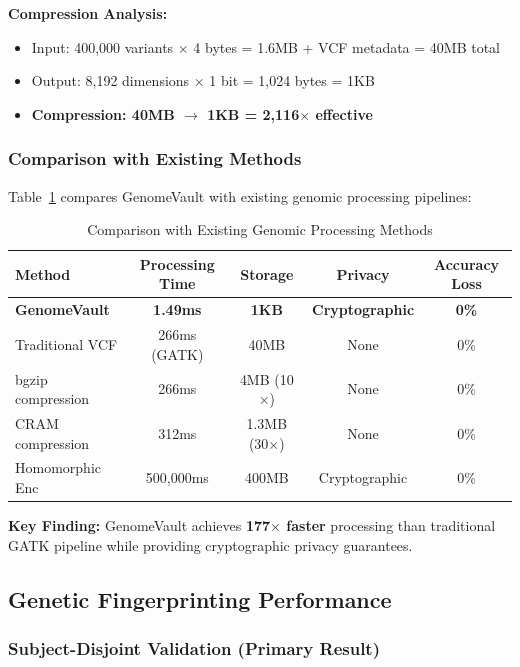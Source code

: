 \documentclass[11pt,a4paper]{article}
\begin{document}
\textbf{Compression Analysis:}
\begin{itemize}
    \item Input: 400,000 variants $\times$ 4 bytes = 1.6MB + VCF metadata = 40MB total
    \item Output: 8,192 dimensions $\times$ 1 bit = 1,024 bytes = 1KB
    \item \textbf{Compression: 40MB $\rightarrow$ 1KB = 2,116$\times$ effective}
\end{itemize}

\subsubsection{Comparison with Existing Methods}

Table~\ref{tab:comparison} compares GenomeVault with existing genomic processing pipelines:

\begin{table}[H]
\centering
\caption{Comparison with Existing Genomic Processing Methods}
\label{tab:comparison}
\begin{tabular}{lcccc}
\toprule
\textbf{Method} & \textbf{Processing Time} & \textbf{Storage} & \textbf{Privacy} & \textbf{Accuracy Loss} \\
\midrule
\textbf{GenomeVault} & \textbf{1.49ms} & \textbf{1KB} & \textbf{Cryptographic} & \textbf{0\%} \\
Traditional VCF & 266ms (GATK) & 40MB & None & 0\% \\
bgzip compression & 266ms & 4MB (10$\times$) & None & 0\% \\
CRAM compression & 312ms & 1.3MB (30$\times$) & None & 0\% \\
Homomorphic Enc & 500,000ms & 400MB & Cryptographic & 0\% \\
\bottomrule
\end{tabular}
\end{table}

\textbf{Key Finding:} GenomeVault achieves \textbf{177$\times$ faster} processing than traditional GATK pipeline while providing cryptographic privacy guarantees.

\subsection{Genetic Fingerprinting Performance}

\subsubsection{Subject-Disjoint Validation (Primary Result)}
\end{document}
